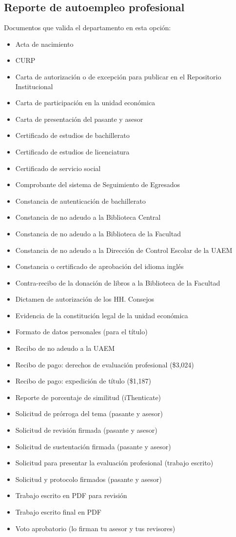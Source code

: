 \subsection{Reporte de autoempleo profesional}
Documentos que valida el departamento en esta opción:
\begin{itemize}
  \item Acta de nacimiento
  \item CURP
  \item Carta de autorización o de excepción para publicar en el Repositorio Institucional
  \item Carta de participación en la unidad económica
  \item Carta de presentación del pasante y asesor
  \item Certificado de estudios de bachillerato
  \item Certificado de estudios de licenciatura
  \item Certificado de servicio social
  \item Comprobante del sistema de Seguimiento de Egresados
  \item Constancia de autenticación de bachillerato
  \item Constancia de no adeudo a la Biblioteca Central
  \item Constancia de no adeudo a la Biblioteca de la Facultad
  \item Constancia de no adeudo a la Dirección de Control Escolar de la UAEM
  \item Constancia o certificado de aprobación del idioma inglés
  \item Contra-recibo de la donación de libros a la Biblioteca de la Facultad
  \item Dictamen de autorización de los HH. Consejos
  \item Evidencia de la constitución legal de la unidad económica
  \item Formato de datos personales (para el título)
  \item Recibo de no adeudo a la UAEM
  \item Recibo de pago: derechos de evaluación profesional (\$3,024)
  \item Recibo de pago: expedición de título (\$1,187)
  \item Reporte de porcentaje de similitud (iThenticate)
  \item Solicitud de prórroga del tema (pasante y asesor)
  \item Solicitud de revisión firmada (pasante y asesor)
  \item Solicitud de sustentación firmada (pasante y asesor)
  \item Solicitud para presentar la evaluación profesional (trabajo escrito)
  \item Solicitud y protocolo firmados (pasante y asesor)
  \item Trabajo escrito en PDF para revisión
  \item Trabajo escrito final en PDF
  \item Voto aprobatorio (lo firman tu asesor y tus revisores)
\end{itemize}
